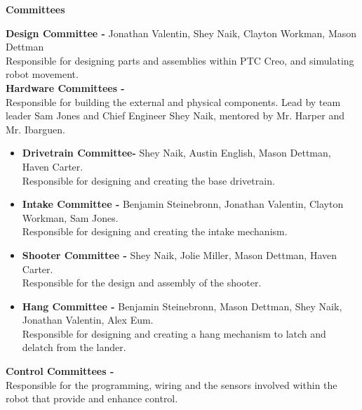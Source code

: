 \documentclass[
letterpaper, %
11pt, %
onecolumn, %
openany, %
]{article}
\begin{document}
                                                     

\clearpage 
\pagestyle{plain}
\noindent\textbf{\Huge Committees}
\newline

\noindent\textbf{\Large Design Committee -} Jonathan Valentin, Shey Naik, Clayton Workman, Mason Dettman \\ Responsible for designing parts and assemblies within PTC Creo, and simulating robot movement. \\
\newline\noindent\textbf{\Large Hardware Committees -}
\\ Responsible for building the external and physical components. Lead by team leader Sam Jones and Chief Engineer Shey Naik, mentored by Mr. Harper and Mr. Ibarguen.\\

\begin{itemize}

\item \textbf{Drivetrain Committee-} Shey Naik, Austin English, Mason Dettman, Haven Carter. \\ Responsible for designing and creating the base drivetrain.

\item \textbf{Intake Committee -} Benjamin Steinebronn, Jonathan Valentin, Clayton Workman, Sam Jones.  \\ Responsible for designing and creating the intake mechanism. 

\item \textbf{Shooter Committee -} Shey Naik, Jolie Miller, Mason Dettman, Haven Carter. \\Responsible for the design and assembly of the shooter. 

\item \textbf{Hang Committee -} Benjamin Steinebronn, Mason Dettman, Shey Naik, Jonathan Valentin, Alex Eum. \\  Responsible for designing and creating a hang mechanism to latch and delatch from the lander. 

\end{itemize} 

\noindent\textbf{\Large Control Committees -} \\ Responsible for the programming, wiring and the sensors involved within the robot that provide and enhance control. 
\end{document}
